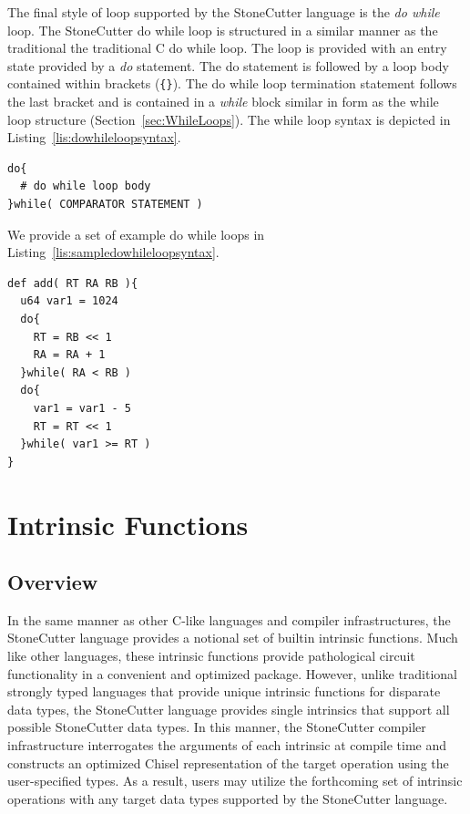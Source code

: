 \documentclass{article}
\begin{document}
The final style of loop supported by the StoneCutter language is the \textit{do while} loop.  The StoneCutter do while 
loop is structured in a similar manner as the traditional the traditional C do while loop.  The loop is provided with 
an entry state provided by a \textit{do} statement.  The do statement is followed by a loop body contained within brackets 
(\texttt{\{\}}).  The do while loop termination statement follows the last bracket and is contained in a \textit{while} block similar 
in form as the while loop structure (Section~\ref{sec:WhileLoops}).  The while loop syntax is depicted in 
Listing~\ref{lis:dowhileloopsyntax}.   

\vspace{0.125in}
\begin{lstlisting}[frame=single,style=base,caption={Do While Loop Syntax},captionpos=b,label={lis:dowhileloopsyntax}]
do{
  # do while loop body
}while( COMPARATOR STATEMENT )
\end{lstlisting}

We provide a set of example do while loops in Listing~\ref{lis:sampledowhileloopsyntax}.

\vspace{0.125in}
\begin{lstlisting}[frame=single,style=base,caption={Sample Do While Loop Syntax},captionpos=b,label={lis:sampledowhileloopsyntax}]
def add( RT RA RB ){
  u64 var1 = 1024
  do{
    RT = RB << 1
    RA = RA + 1
  }while( RA < RB )  
  do{
    var1 = var1 - 5
    RT = RT << 1
  }while( var1 >= RT )
}
\end{lstlisting}

\clearpage
\section{Intrinsic Functions}
\label{sec:IntrinsicFunctions}

\subsection{Overview}
\label{sec:IntrinsicOverview}

In the same manner as other C-like languages and compiler infrastructures, 
the StoneCutter language provides a notional set of builtin intrinsic functions.  
Much like other languages, these intrinsic functions provide pathological 
circuit functionality in a convenient and optimized package.  However, 
unlike traditional strongly typed languages that provide unique intrinsic 
functions for disparate data types, the StoneCutter language provides 
single intrinsics that support all possible StoneCutter data types.  In this manner, 
the StoneCutter compiler infrastructure interrogates the arguments of each intrinsic 
at compile time and constructs an optimized Chisel representation of the target 
operation using the user-specified types.  As a result, users may utilize the forthcoming 
set of intrinsic operations with any target data types supported by the StoneCutter language.  
\end{document}
